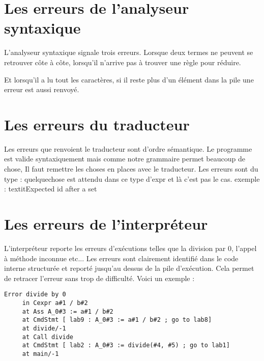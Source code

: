 \section{Les erreurs de l'analyseur syntaxique}
  L'analyseur syntaxique signale trois erreurs. Lorsque deux termes ne peuvent se retrouver côte à côte, lorsqu'il n'arrive pas à trouver une règle pour réduire.


Et lorsqu'il a lu tout les caractères, si il reste plus d'un élément dans la pile une erreur est aussi renvoyé.
\section{Les erreurs du traducteur}
    Les erreurs que renvoient le traducteur sont d'ordre sémantique. Le programme est valide syntaxiquement mais comme notre grammaire permet beaucoup de chose,
Il faut remettre les choses en places avec le traducteur. Les erreurs sont du type : quelquechose est attendu dans ce type d'expr et là c'est pas le cas. 
exemple : textit{Expected id after a set}


\section{Les erreurs de l'interpréteur}
  L'interpréteur reporte les erreurs d'exécutions telles que la division par 0, l'appel à méthode inconnue etc...
  Les erreurs sont clairement identifié dans le code interne structurée et reporté jusqu'au dessus de la pile d'exécution. Cela permet de retracer l'erreur
sans trop de difficulté. 
Voici un exemple : 
\begin{verbatim}
Error divide by 0
	 in Cexpr a#1 / b#2
	 at Ass A_0#3 := a#1 / b#2
	 at CmdStmt [ lab9 : A_0#3 := a#1 / b#2 ; go to lab8]
	 at divide/-1
	 at Call divide
	 at CmdStmt [ lab2 : A_0#3 := divide(#4, #5) ; go to lab1]
	 at main/-1
\end{verbatim}
